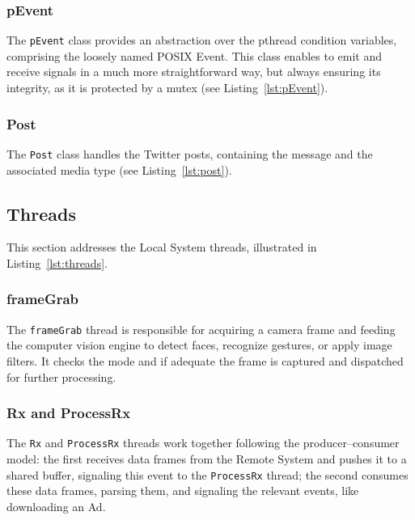 

\subsubsection{pEvent}
\label{sec:msgqueue}
The \texttt{pEvent} class provides an abstraction over the pthread condition
variables, comprising the loosely named POSIX Event. This class enables to emit
and receive signals in a much more straightforward way, but always ensuring its
integrity, as it is protected by a mutex
(see Listing~\ref{lst:pEvent}).



\subsubsection{Post}
\label{sec:post}
The \texttt{Post} class handles the Twitter posts, containing the message and
the associated media type
(see Listing~\ref{lst:post}).



\subsection{Threads}
\label{sec:threads}
This section addresses the Local System threads, illustrated in Listing~\ref{lst:threads}.



\subsubsection{frameGrab}
\label{sec:framegrab}
The \texttt{frameGrab} thread is responsible for acquiring a camera frame and
feeding the computer vision engine to detect faces, recognize gestures, or apply
image filters. It checks the mode and if adequate the frame is captured and
dispatched for further processing.

\subsubsection{Rx and ProcessRx}
\label{sec:rx}
The \texttt{Rx} and \texttt{ProcessRx} threads work together following the
producer--consumer model: the first receives data frames from the Remote System
and pushes it to a shared buffer, signaling this event to the \texttt{ProcessRx}
thread;
the second consumes these data frames, parsing them, and signaling the relevant
events, like downloading an Ad.

